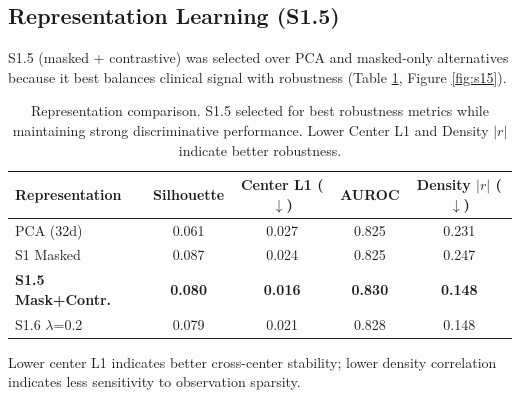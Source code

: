 \documentclass[11pt,a4paper]{article}
\begin{document}
\FloatBarrier

\subsection{Representation Learning (S1.5)}

S1.5 (masked + contrastive) was selected over PCA and masked-only alternatives because it best balances clinical signal with robustness (Table \ref{tab:repr}, Figure \ref{fig:s15}).

\begin{table}[htbp]
\centering
\caption{Representation comparison. S1.5 selected for best robustness metrics while maintaining strong discriminative performance. Lower Center L1 and Density $|r|$ indicate better robustness.}
\label{tab:repr}
\small
\begin{tabular}{lcccc}
\toprule
\textbf{Representation} & \textbf{Silhouette} & \textbf{Center L1} ($\downarrow$) & \textbf{AUROC} & \textbf{Density} $|r|$ ($\downarrow$) \\
\midrule
PCA (32d) & 0.061 & 0.027 & 0.825 & 0.231 \\
S1 Masked & 0.087 & 0.024 & 0.825 & 0.247 \\
\textbf{S1.5 Mask+Contr.} & \textbf{0.080} & \textbf{0.016} & \textbf{0.830} & \textbf{0.148} \\
S1.6 $\lambda$=0.2 & 0.079 & 0.021 & 0.828 & 0.148 \\
\bottomrule
\end{tabular}
\end{table}

Lower center L1 indicates better cross-center stability; lower density correlation indicates less sensitivity to observation sparsity.
\end{document}
